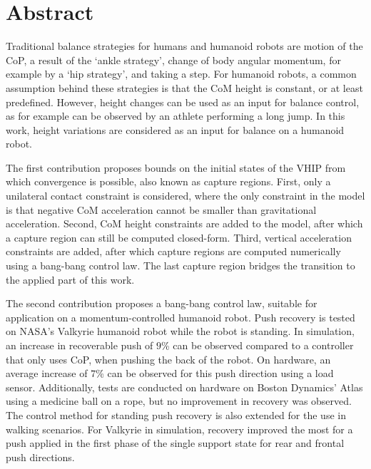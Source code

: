 %
\chapter*{Abstract}%

Traditional balance strategies for humans and humanoid robots are motion of the \ac{CoP}, a result of the `ankle strategy', change of body angular momentum, for example by a `hip strategy', and taking a step. For humanoid robots, a common assumption behind these strategies is that the \ac{CoM} height is constant, or at least predefined. However, height changes can be used as an input for balance control, as for example can be observed by an athlete performing a long jump. In this work, height variations are considered as an input for balance on a humanoid robot.

The first contribution proposes bounds on the initial states of the \ac{VHIP} from which convergence is possible, also known as capture regions. First, only a unilateral contact constraint is considered, where the only constraint in the model is that negative \ac{CoM} acceleration cannot be smaller than gravitational acceleration. Second, \ac{CoM} height constraints are added to the model, after which a capture region can still be computed closed-form. Third, vertical acceleration constraints are added, after which capture regions are computed numerically using a bang-bang control law. The last capture region bridges the transition to the applied part of this work.

The second contribution proposes a bang-bang control law, suitable for application on a momentum-controlled humanoid robot. Push recovery is tested on NASA's Valkyrie humanoid robot while the robot is standing. In simulation, an increase in recoverable push of $9$\% can be observed compared to a controller that only uses \ac{CoP}, when pushing the back of the robot. On hardware, an average increase of $7$\% can be observed for this push direction using a load sensor. Additionally, tests are conducted on hardware on Boston Dynamics' Atlas using a medicine ball on a rope, but no improvement in recovery was observed. The control method for standing push recovery is also extended for the use in walking scenarios. For Valkyrie in simulation, recovery improved the most for a push applied in the first phase of the single support state for rear and frontal push directions. 